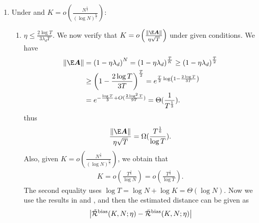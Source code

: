 \begin{enumerate}[leftmargin=*]
    \item Under  and $K = o\left(\frac{N^{\frac{1}{5}}}{\left(\log N\right)^{\frac{6}{5}}}\right)$:
    \begin{enumerate}[leftmargin=*]
        \item $\eta \leq \frac{2\log T}{3\lambda_dT}$. We now verify that $K=o\left(\frac{\|\E\mA\|}{\eta\sqrt{T}}\right)$ under given conditions.
        We have
        \begin{align*}
            \|\E\mA\|&=\left(1-\eta\lambda_d\right)^{N}=\left(1-\eta\lambda_d\right)^{\frac{T}{K}}\geq \left(1-\eta\lambda_d\right)^{\frac{T}{2}} \\
            &\geq \left(1-\frac{2\log T}{3T}\right)^{\frac{T}{2}}=e^{\frac{T}{2}\log\left(1-\frac{2\log T}{3T}\right)} \\
            &=e^{-\frac{\log T}{3}+O(\frac{2\log^2 T}{9T})}=\Theta(\frac{1}{T^{\frac{1}{3}}}).
        \end{align*}
        thus
        \begin{align*}
            \frac{\|\E\mA\|}{\eta\sqrt{T}}=\Omega(\frac{T^{\frac{1}{6}}}{\log T}).
        \end{align*}
        Also, given $K = o\left(\frac{N^{\frac{1}{5}}}{\left(\log N\right)^{\frac{6}{5}}}\right)$, we obtain that
        \begin{align*}
            K =o\left(\frac{T^{\frac{1}{6}}}{\log N}\right)=o\left(\frac{T^{\frac{1}{6}}}{\log T}\right).
        \end{align*}
        The second equality uses $\log T=\log N+\log K=\Theta(\log N)$. Now we use the results in  and , and then the estimated distance can be given as 
        \begin{align*}
            &\left|\Tilde{\cR}^{\bias}(K, N;\eta) -\bar{\cR}^{\bias}(K,N;\eta)\right| \\

\end{align*}
\end{enumerate}
\end{enumerate}
